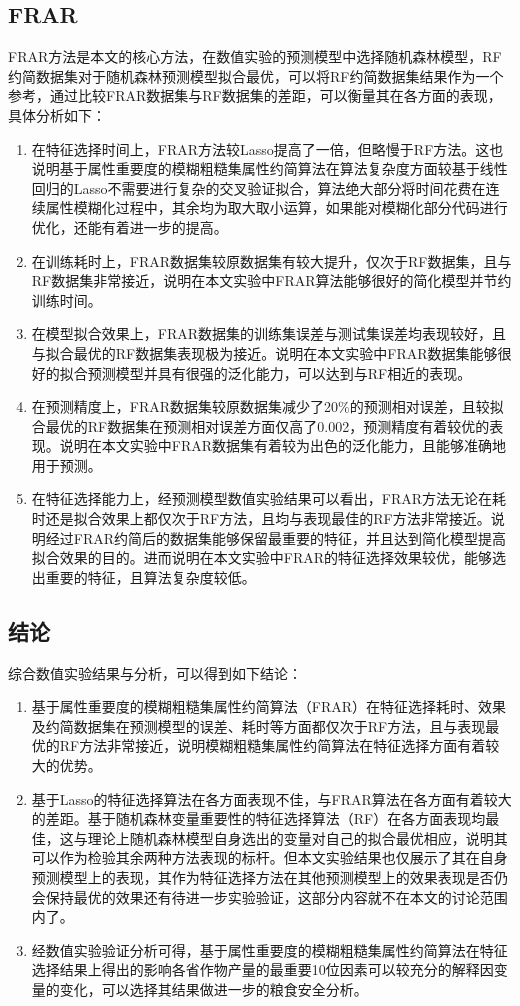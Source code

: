 \subsection{FRAR}
FRAR方法是本文的核心方法，在数值实验的预测模型中选择随机森林模型，RF约简数据集对于随机森林预测模型拟合最优，可以将RF约简数据集结果作为一个参考，通过比较FRAR数据集与RF数据集的差距，可以衡量其在各方面的表现，具体分析如下：
\begin{enumerate}
  \item 在特征选择时间上，FRAR方法较Lasso提高了一倍，但略慢于RF方法。这也说明基于属性重要度的模糊粗糙集属性约简算法在算法复杂度方面较基于线性回归的Lasso不需要进行复杂的交叉验证拟合，算法绝大部分将时间花费在连续属性模糊化过程中，其余均为取大取小运算，如果能对模糊化部分代码进行优化，还能有着进一步的提高。
  \item 在训练耗时上，FRAR数据集较原数据集有较大提升，仅次于RF数据集，且与RF数据集非常接近，说明在本文实验中FRAR算法能够很好的简化模型并节约训练时间。
  \item 在模型拟合效果上，FRAR数据集的训练集误差与测试集误差均表现较好，且与拟合最优的RF数据集表现极为接近。说明在本文实验中FRAR数据集能够很好的拟合预测模型并具有很强的泛化能力，可以达到与RF相近的表现。
  \item 在预测精度上，FRAR数据集较原数据集减少了20\%的预测相对误差，且较拟合最优的RF数据集在预测相对误差方面仅高了0.002，预测精度有着较优的表现。说明在本文实验中FRAR数据集有着较为出色的泛化能力，且能够准确地用于预测。
  \item 在特征选择能力上，经预测模型数值实验结果可以看出，FRAR方法无论在耗时还是拟合效果上都仅次于RF方法，且均与表现最佳的RF方法非常接近。说明经过FRAR约简后的数据集能够保留最重要的特征，并且达到简化模型提高拟合效果的目的。进而说明在本文实验中FRAR的特征选择效果较优，能够选出重要的特征，且算法复杂度较低。
\end{enumerate}
\subsection{结论}
综合数值实验结果与分析，可以得到如下结论：
\begin{enumerate}
  \item 基于属性重要度的模糊粗糙集属性约简算法（FRAR）在特征选择耗时、效果及约简数据集在预测模型的误差、耗时等方面都仅次于RF方法，且与表现最优的RF方法非常接近，说明模糊粗糙集属性约简算法在特征选择方面有着较大的优势。
  \item 基于Lasso的特征选择算法在各方面表现不佳，与FRAR算法在各方面有着较大的差距。基于随机森林变量重要性的特征选择算法（RF）在各方面表现均最佳，这与理论上随机森林模型自身选出的变量对自己的拟合最优相应，说明其可以作为检验其余两种方法表现的标杆。但本文实验结果也仅展示了其在自身预测模型上的表现，其作为特征选择方法在其他预测模型上的效果表现是否仍会保持最优的效果还有待进一步实验验证，这部分内容就不在本文的讨论范围内了。
  \item 经数值实验验证分析可得，基于属性重要度的模糊粗糙集属性约简算法在特征选择结果上得出的影响各省作物产量的最重要10位因素可以较充分的解释因变量的变化，可以选择其结果做进一步的粮食安全分析。
\end{enumerate}

